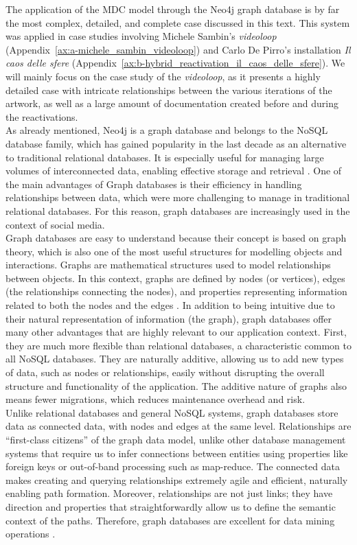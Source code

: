 The application of the MDC model through the Neo4j graph database is by far the most complex, detailed, and complete case discussed in this text. This system was applied in case studies involving Michele Sambin’s \textit{videoloop} (Appendix~\ref{ax:a-michele_sambin_videoloop}) and Carlo De Pirro’s installation \textit{Il caos delle sfere} (Appendix~\ref{ax:b-hybrid_reactivation_il_caos_delle_sfere}). We will mainly focus on the case study of the \textit{videoloop}, as it presents a highly detailed case with intricate relationships between the various iterations of the artwork, as well as a large amount of documentation created before and during the reactivations.\\
As already mentioned, Neo4j is a graph database and belongs to the NoSQL database family, which has gained popularity in the last decade as an alternative to traditional relational databases. It is especially useful for managing large volumes of interconnected data, enabling effective storage and retrieval \cite{lourencco2015choosing}. One of the main advantages of Graph databases is their efficiency in handling relationships between data, which were more challenging to manage in traditional relational databases. For this reason, graph databases are increasingly used in the context of social media.\\
Graph databases are easy to understand because their concept is based on graph theory, which is also one of the most useful structures for modelling objects and interactions. Graphs are mathematical structures used to model relationships between objects. In this context, graphs are defined by nodes (or vertices), edges (the relationships connecting the nodes), and properties representing information related to both the nodes and the edges \cite{guia2017graph}. In addition to being intuitive due to their natural representation of information (the graph), graph databases offer many other advantages that are highly relevant to our application context. First, they are much more flexible than relational databases, a characteristic common to all NoSQL databases. They are naturally additive, allowing us to add new types of data, such as nodes or relationships, easily without disrupting the overall structure and functionality of the application. The additive nature of graphs also means fewer migrations, which reduces maintenance overhead and risk.\\
Unlike relational databases and general NoSQL systems, graph databases store data as connected data, with nodes and edges at the same level. Relationships are ``first-class citizens'' of the graph data model, unlike other database management systems that require us to infer connections between entities using properties like foreign keys or out-of-band processing such as map-reduce. The connected data makes creating and querying relationships extremely agile and efficient, naturally enabling path formation. Moreover, relationships are not just links; they have direction and properties that straightforwardly allow us to define the semantic context of the paths. Therefore, graph databases are excellent for data mining operations \cite{robinson2013graph}.\\
